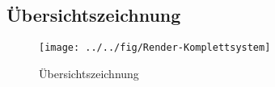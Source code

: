 \subsection{Übersichtszeichnung}
\begin{figure}[h!]
	\centering
	\texttt{[image: ../../fig/Render-Komplettsystem]}
	\caption{Übersichtszeichnung}
	\label{fig:Übersichtszeichnung}
\end{figure}